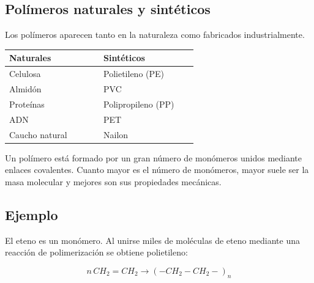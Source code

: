 \subsection{Polímeros naturales y sintéticos}

Los polímeros aparecen tanto en la naturaleza como fabricados industrialmente.

\begin{center}
\begin{tabular}{@{}p{0.42\linewidth}p{0.42\linewidth}@{}}
    \toprule
    \textbf{Naturales} & \textbf{Sintéticos} \\
    \midrule
    Celulosa & Polietileno (PE) \\[3pt]
    Almidón & PVC \\[3pt]
    Proteínas & Polipropileno (PP) \\[3pt]
    ADN & PET \\[3pt]
    Caucho natural & Nailon \\
    \bottomrule
\end{tabular}
\end{center}

\begin{tcolorbox}[title=Recuerda,colback=blue!5,colframe=blue]
Un polímero está formado por un gran número de monómeros unidos mediante enlaces
covalentes. Cuanto mayor es el número de monómeros, mayor suele ser la masa molecular
y mejores son sus propiedades mecánicas.
\end{tcolorbox}

\subsection*{Ejemplo}

El eteno es un monómero. Al unirse miles de moléculas de eteno mediante una reacción
de polimerización se obtiene polietileno:

\[
n\,CH_2=CH_2 \longrightarrow (-CH_2-CH_2-)_n
\]

